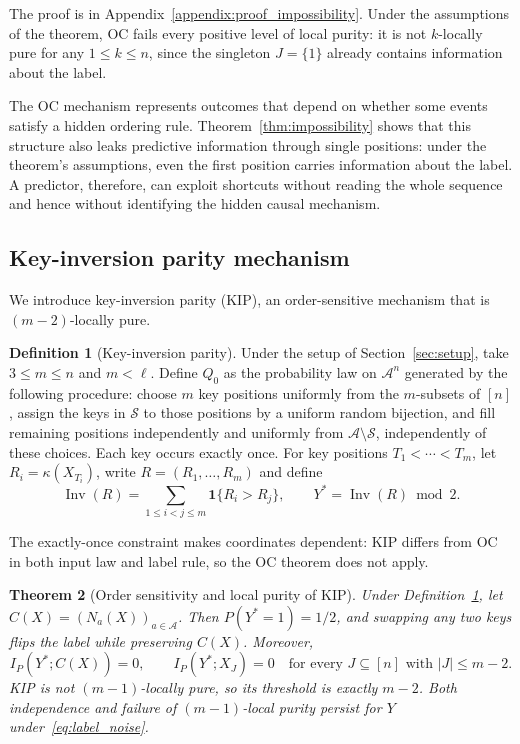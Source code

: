 \documentclass{article} %
\theoremstyle{plain}
\newtheorem{theorem}{Theorem}[section]
\theoremstyle{definition}
\newtheorem{definition}[theorem]{Definition}
\theoremstyle{remark}
\begin{document}
The proof is in Appendix~\ref{appendix:proof_impossibility}. Under the assumptions of the theorem, OC fails every positive level of local purity: it is not \(k\)-locally pure for any \(1\leq k\leq n\), since the singleton \(J=\{1\}\) already contains information about the label. 

The OC mechanism represents outcomes that depend on whether some events satisfy a hidden ordering rule. Theorem~\ref{thm:impossibility} shows that this structure also leaks predictive information through single positions: under the theorem's assumptions, even the first position carries information about the label. A predictor, therefore, can exploit shortcuts without reading the whole sequence and hence without identifying the hidden causal mechanism.

\subsection{Key-inversion parity mechanism}
\label{sec:kip}
We introduce key-inversion parity (KIP), an order-sensitive mechanism that is $(m-2)$-locally pure.

\begin{definition}[Key-inversion parity]
\label{def:kip}
Under the setup of Section~\ref{sec:setup}, take $3\leq m\leq n$ and $m<\ell$. Define $Q_0$ as the probability law on $\mathcal{A}^n$ generated by the following procedure: choose $m$ key positions uniformly from the $m$-subsets of $[n]$, assign the keys in $\mathcal{S}$ to those positions by a uniform random bijection, and fill remaining positions independently and uniformly from $\mathcal{A}\setminus\mathcal{S}$, independently of these choices. Each key occurs exactly once. For key positions $T_1<\cdots<T_m$, let $R_i=\kappa(X_{T_i})$, write $R=(R_1,\ldots,R_m)$ and define
\begin{equation}
\label{eq:kip_label}
\operatorname{Inv}(R)=\sum_{1\leq i<j\leq m}\mathbf{1}\{R_i>R_j\},\qquad Y^*=\operatorname{Inv}(R)\bmod2.
\end{equation}
\end{definition}

The exactly-once constraint makes coordinates dependent: KIP differs from OC in both input law and label rule, so the OC theorem does not apply.

\begin{theorem}[Order sensitivity and local purity of KIP]
\label{thm:kip_local_purity}
Under Definition~\ref{def:kip}, let $C(X)=(N_a(X))_{a\in\mathcal{A}}$. Then $P(Y^*=1)=1/2$, and swapping any two keys flips the label while preserving $C(X)$. Moreover,
\[
I_P(Y^*;C(X))=0,\qquad I_P(Y^*;X_J)=0\quad\text{for every }J\subseteq[n]\text{ with }|J|\leq m-2.
\]
KIP is not $(m-1)$-locally pure, so its threshold is exactly $m-2$. Both independence and failure of $(m-1)$-local purity persist for $Y$ under~\eqref{eq:label_noise}.
\end{theorem}
\end{document}
